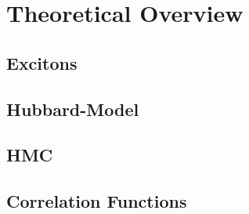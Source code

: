 
\chapter{Theoretical Overview}
\label{sec:theory}

\section{Excitons}
\section{Hubbard-Model}
\section{HMC}
\section{Correlation Functions}
